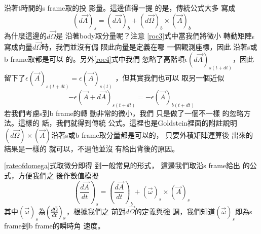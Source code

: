 \documentclass{article}
\begin{document}
沿著t時間的s frame取的投%
影量。這邊值得一提%
的是，傳統公式大多%
寫成%
\begin{equation*}
\left( d\vec{A}\right) _{s}=\left( d\vec{A}\right) _{b}+\left( d\vec{\Omega}%
\right) _{b}\times \left( \vec{A}\right) _{b}
\end{equation*}%
為什麼這邊的$d\vec{\Omega}$是%
沿著body取分量呢？注意%
\ref{roc3}式中當我們將微小%
轉動矩陣$\epsilon $寫成向量$d%
\vec{\Omega}$時，我們並沒有侷%
限此向量是定義在哪%
一個觀測座標，因此%
沿著s或b frame取都是可以%
的。另外\ref{roc4}式中我們%
忽略了高階項$\epsilon \left( d\vec{A}%
\right) _{s(t+dt)}$，因此留下了$\epsilon
\left( \vec{A}\right) _{s(t+dt)}=\epsilon \left( \vec{A}\right) _{s(t)}$%
，但其實我們也可以%
取另一個近似%
\begin{equation*}
-\epsilon \left( \vec{A}+d\vec{A}\right) _{s(t+dt)}=-\epsilon \left( \vec{A}%
\right) _{b(t+dt)}
\end{equation*}%
若我們考慮s到b frame的轉%
動非常的微小，我們%
只是做了一個不一樣%
的忽略方法。這樣的%
話，我們就得到傳統%
公式。這裡也是Goldstein\cite%
{goldstein}裡面的附註說明$\left( d%
\vec{\Omega}\right) \times \left( \vec{A}\right) $沿著s或b
frame取分量都是可以的，%
只要外積矩陣運算後%
出來的結果是一樣的%
就可以，不過他並沒%
有給出背後的原因。

\bigskip \ref{rateofdomega}式取微分即得%
到一般常見的形式，%
這邊我們取沿s frame給出%
的公式，方便我們之%
後作數值模擬%
\begin{equation}
\left( \frac{d\vec{A}}{dt}\right) _{s}=\left( \frac{d\vec{A}}{dt}\right)
_{b}+\left( \vec{\omega}\right) _{s}\times \left( \vec{A}\right) _{s}
\label{rateofchange}
\end{equation}%
其中$\left( \vec{\omega}\right) _{s}$為$\left( \frac{d\vec{%
\Omega}}{dt}\right) _{s}$，根據我們之%
前對$d\vec{\Omega}$的定義與強%
調，我們知道$\left( \vec{\omega}\right)
_{s}$即為s frame到b frame的瞬時角%
速度。
\end{document}
